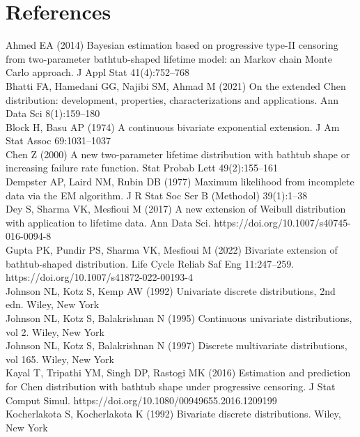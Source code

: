 \documentclass[11pt,a4paper]{article}
\begin{document}
\newpage
\newpage
\section*{References}
{\small
\noindent Ahmed EA (2014) Bayesian estimation based on progressive type-II censoring from two-parameter bathtub-shaped lifetime model: an Markov chain Monte Carlo approach. J Appl Stat 41(4):752--768\\[0.35em]
\noindent Bhatti FA, Hamedani GG, Najibi SM, Ahmad M (2021) On the extended Chen distribution: development, properties, characterizations and applications. Ann Data Sci 8(1):159--180\\[0.35em]
\noindent Block H, Basu AP (1974) A continuous bivariate exponential extension. J Am Stat Assoc 69:1031--1037\\[0.35em]
\noindent Chen Z (2000) A new two-parameter lifetime distribution with bathtub shape or increasing failure rate function. Stat Probab Lett 49(2):155--161\\[0.35em]
\noindent Dempster AP, Laird NM, Rubin DB (1977) Maximum likelihood from incomplete data via the EM algorithm. J R Stat Soc Ser B (Methodol) 39(1):1--38\\[0.35em]
\noindent Dey S, Sharma VK, Mesfioui M (2017) A new extension of Weibull distribution with application to lifetime data. Ann Data Sci. https://doi.org/10.1007/s40745-016-0094-8\\[0.35em]
\noindent Gupta PK, Pundir PS, Sharma VK, Mesfioui M (2022) Bivariate extension of bathtub-shaped distribution. Life Cycle Reliab Saf Eng 11:247--259. https://doi.org/10.1007/s41872-022-00193-4\\[0.35em]
\noindent Johnson NL, Kotz S, Kemp AW (1992) Univariate discrete distributions, 2nd edn. Wiley, New York\\[0.35em]
\noindent Johnson NL, Kotz S, Balakrishnan N (1995) Continuous univariate distributions, vol 2. Wiley, New York\\[0.35em]
\noindent Johnson NL, Kotz S, Balakrishnan N (1997) Discrete multivariate distributions, vol 165. Wiley, New York\\[0.35em]
\noindent Kayal T, Tripathi YM, Singh DP, Rastogi MK (2016) Estimation and prediction for Chen distribution with bathtub shape under progressive censoring. J Stat Comput Simul. https://doi.org/10.1080/00949655.2016.1209199\\[0.35em]
\noindent Kocherlakota S, Kocherlakota K (1992) Bivariate discrete distributions. Wiley, New York\\[0.35em]
}
\end{document}
